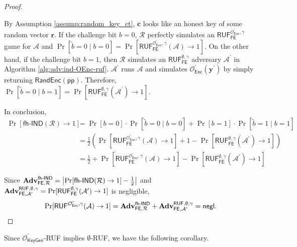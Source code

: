 \begin{proof}
\begin{figure}[h]
\end{figure}

By Assumption \ref{assump:random_key_ct}, $\mathbf{c}$ looks like an honest key of some random vector $\mathbf{r}$. If the challenge bit $b = 0$, $\mathcal{R}$ perfectly simulates an $\textsf{RUF}^{\mathcal{O}^\prime_{\textsf{Enc}}, \gamma}_{\textsf{FE}}$ game for $\mathcal{A}$ and $\Pr[\tilde{b} = 0 \mid b = 0] = \Pr[ \textsf{RUF}^{\mathcal{O}^\prime_{\textsf{Enc}}, \gamma}_{\textsf{FE}}(\mathcal{A}) \to 1 ]$. On the other hand, if the challenge bit $b = 1$, then $\mathcal{R}$ simulates an $\textsf{RUF}^{\emptyset, \gamma}_{\textsf{FE}}$ adversary $\mathcal{A}^\prime$ in Algorithm \ref{alg:adv:ind-OEnc-ruf}. $\mathcal{A}^\prime$ runs $\mathcal{A}$ and simulates $\mathcal{O}^\prime_{\textsf{Enc}}(\mathbf{y}^\prime)$ by simply returning $\textsf{RandEnc}(\textsf{pp})$. Therefore, $\Pr[\tilde{b} = 0 \mid b = 1] = \Pr[ \textsf{RUF}^{\emptyset, \gamma}_{\textsf{FE}}(\mathcal{A}^\prime) \to 1 ]$.

In conclusion,
\begin{align*}
	\Pr[\textsf{fh-IND}(\mathcal{R}) \to 1] 
	&= \Pr[b = 0] \cdot \Pr[\tilde{b} = 0 \mid b = 0] + \Pr[b = 1] \cdot \Pr[\tilde{b} = 1 \mid b = 1] \\
	&= \frac{1}{2} \left( \Pr[\textsf{RUF}^{\mathcal{O}^\prime_{\textsf{Enc}}, \gamma}_{\textsf{FE}}(\mathcal{A}) \to 1] + 1 - \Pr[ \textsf{RUF}^{\emptyset, \gamma}_{\textsf{FE}}(\mathcal{A}^\prime) \to 1 ] \right) \\
	&= \frac{1}{2} + \Pr[\textsf{RUF}^{\mathcal{O}^\prime_{\textsf{Enc}}, \gamma}_{\textsf{FE}}(\mathcal{A}) \to 1] - \Pr[ \textsf{RUF}^{\emptyset, \gamma}_{\textsf{FE}}(\mathcal{A}^\prime) \to 1 ]
\end{align*}

Since $\mathbf{Adv}_{\textsf{FE}, \mathcal{R}}^\textsf{fh-IND} = \left| \Pr[\textsf{fh-IND}(\mathcal{R}) \to 1] - \frac{1}{2} \right|$ and $\mathbf{Adv}_{\textsf{FE}, \mathcal{A}^\prime }^{\textsf{RUF}, \emptyset, \gamma} = \Pr[\textsf{RUF}^{\emptyset, \gamma}_{\textsf{FE}}(\mathcal{A}^\prime) \to 1 ]$ is negligible,
\[
	\Pr[ \textsf{RUF}^{\mathcal{O}^\prime_{\textsf{Enc}}, \gamma}(\mathcal{A}) \to 1]  = \mathbf{Adv}_{\textsf{FE}, \mathcal{R}}^\textsf{fh-IND} + \mathbf{Adv}_{\textsf{FE}, \mathcal{A}^\prime }^{\textsf{RUF}, \emptyset, \gamma} = \mathsf{negl}.
\]

\end{proof}

Since $\mathcal{O}^\prime_{\textsf{KeyGen}}$-RUF implies $\emptyset$-RUF, we have the following corollary.

